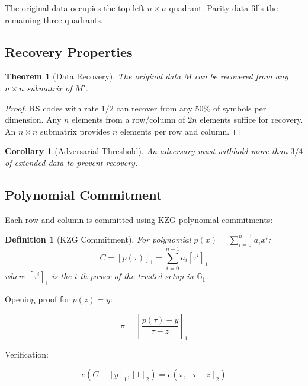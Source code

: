 \documentclass[11pt,a4paper]{article}
\newtheorem{definition}{Definition}
\newtheorem{theorem}{Theorem}
\newtheorem{corollary}{Corollary}
\begin{document}
The original data occupies the top-left $n \times n$ quadrant. Parity data fills the remaining three quadrants.

\subsection{Recovery Properties}

\begin{theorem}[Data Recovery]
The original data $M$ can be recovered from any $n \times n$ submatrix of $M'$.
\end{theorem}

\begin{proof}
RS codes with rate $1/2$ can recover from any 50\% of symbols per dimension. Any $n$ elements from a row/column of $2n$ elements suffice for recovery. An $n \times n$ submatrix provides $n$ elements per row and column.
\end{proof}

\begin{corollary}[Adversarial Threshold]
An adversary must withhold more than $3/4$ of extended data to prevent recovery.
\end{corollary}

\subsection{Polynomial Commitment}

Each row and column is committed using KZG polynomial commitments:

\begin{definition}[KZG Commitment]
For polynomial $p(x) = \sum_{i=0}^{n-1} a_i x^i$:
\begin{equation}
    C = [p(\tau)]_1 = \sum_{i=0}^{n-1} a_i [\tau^i]_1
\end{equation}
where $[\tau^i]_1$ is the $i$-th power of the trusted setup in $\mathbb{G}_1$.
\end{definition}

Opening proof for $p(z) = y$:

\begin{equation}
    \pi = \left[\frac{p(\tau) - y}{\tau - z}\right]_1
\end{equation}

Verification:

\begin{equation}
    e(C - [y]_1, [1]_2) = e(\pi, [\tau - z]_2)
\end{equation}
\end{document}
